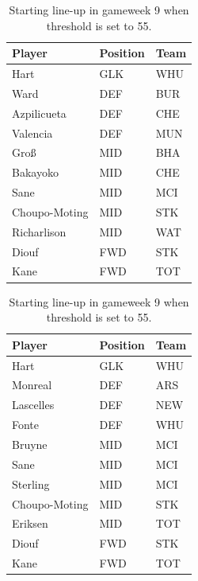 \begin{table}[H]
\centering
\parbox{.45\linewidth}{
\begin{tabular}{@{}lll@{}}
\toprule
Player        & Position & Team \\ \midrule
Hart          & GLK      & WHU  \\
Ward          & DEF      & BUR  \\
Azpilicueta   & DEF      & CHE  \\
Valencia      & DEF      & MUN  \\
Gro\ss         & MID      & BHA  \\
Bakayoko      & MID      & CHE  \\
Sane          & MID      & MCI  \\
Choupo-Moting & MID      & STK  \\
Richarlison   & MID      & WAT  \\
Diouf         & FWD      & STK  \\
Kane          & FWD      & TOT  \\ \bottomrule
\end{tabular}
\caption{Starting line-up in gameweek 9 when threshold is set to 7.5.}
\label{tab:starting_line_up_threshold_7.5}
}
\hfill
\parbox{.45\linewidth}{
\centering
\begin{tabular}{@{}lll@{}}
\toprule
Player        & Position & Team \\ \midrule
Hart          & GLK      & WHU  \\
Monreal       & DEF      & ARS  \\
Lascelles     & DEF      & NEW  \\
Fonte         & DEF      & WHU  \\
Bruyne        & MID      & MCI  \\
Sane          & MID      & MCI  \\
Sterling      & MID      & MCI  \\
Choupo-Moting & MID      & STK  \\
Eriksen       & MID      & TOT  \\
Diouf         & FWD      & STK  \\
Kane          & FWD      & TOT  \\ \bottomrule
\end{tabular}
\caption{Starting line-up in gameweek 9 when threshold is set to 55.}
\label{tab:starting_line_up_threshold_55}
}
\end{table}


